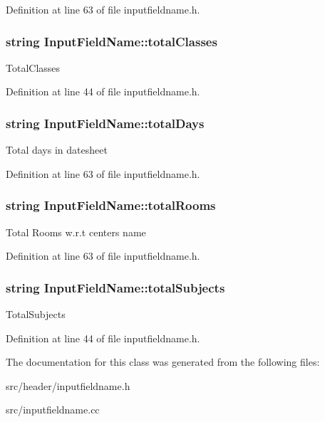 Definition at line 63 of file inputfieldname.\-h.

\hypertarget{classInputFieldName_a5bf413dee6dcf29c1872e93f150d48c0}{
\subsubsection[{total\-Classes}]{\setlength{\rightskip}{0pt plus 5cm}string Input\-Field\-Name\-::total\-Classes}}\label{classInputFieldName_a5bf413dee6dcf29c1872e93f150d48c0}
Total\-Classes 

Definition at line 44 of file inputfieldname.\-h.

\hypertarget{classInputFieldName_a12ba65660edd7f8f7ecf1e25893716da}{
\subsubsection[{total\-Days}]{\setlength{\rightskip}{0pt plus 5cm}string Input\-Field\-Name\-::total\-Days}}\label{classInputFieldName_a12ba65660edd7f8f7ecf1e25893716da}
Total days in datesheet 

Definition at line 63 of file inputfieldname.\-h.

\hypertarget{classInputFieldName_a51fe8230341d7863ffd4672f2c986beb}{
\subsubsection[{total\-Rooms}]{\setlength{\rightskip}{0pt plus 5cm}string Input\-Field\-Name\-::total\-Rooms}}\label{classInputFieldName_a51fe8230341d7863ffd4672f2c986beb}
Total Rooms w.\-r.\-t centers name 

Definition at line 63 of file inputfieldname.\-h.

\hypertarget{classInputFieldName_ac58130077f39d82aaf447b1a67e9f70f}{
\subsubsection[{total\-Subjects}]{\setlength{\rightskip}{0pt plus 5cm}string Input\-Field\-Name\-::total\-Subjects}}\label{classInputFieldName_ac58130077f39d82aaf447b1a67e9f70f}
Total\-Subjects 

Definition at line 44 of file inputfieldname.\-h.



The documentation for this class was generated from the following files\-:\begin{DoxyCompactItemize}
\item 
src/header/inputfieldname.\-h\item 
src/inputfieldname.\-cc\end{DoxyCompactItemize}
